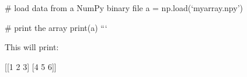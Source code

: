 \documentclass[11pt]{article}
\newenvironment{Shaded}{}{}
\newcommand{\DecValTok}[1]{\textcolor[rgb]{0.25,0.63,0.44}{{#1}}}
\newcommand{\NormalTok}[1]{{#1}}
\begin{document}
\begin{itemize}
  \# load data from a NumPy binary file a = np.load(`myarray.npy')

  \# print the array print(a) ```

  This will print:

\begin{Shaded}
\begin{Highlighting}[]
\NormalTok{[[}\DecValTok{1} \DecValTok{2} \DecValTok{3}\NormalTok{]}
\NormalTok{ [}\DecValTok{4} \DecValTok{5} \DecValTok{6}\NormalTok{]]}
\end{Highlighting}
\end{Shaded}
\end{itemize}



    
    
    
\end{document}
